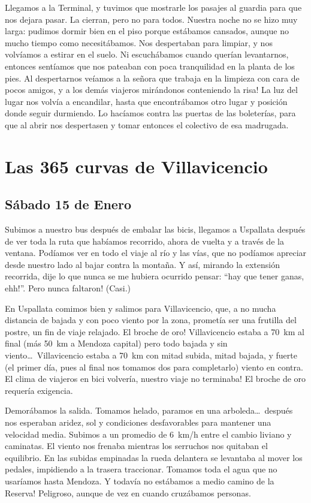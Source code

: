 Llegamos a la Terminal, y tuvimos que mostrarle los pasajes al guardia para que
nos dejara pasar. La cierran, pero no para todos. Nuestra noche no se hizo muy
larga: pudimos dormir bien en el piso porque est\'abamos cansados, aunque no
mucho tiempo como necesit\'abamos. Nos despertaban para limpiar, y nos
volv\'iamos a estirar en el suelo. Ni escuch\'abamos cuando quer\'ian
levantarnos, entonces sent\'iamos que nos pateaban con poca tranquilidad en la
planta de los pies. \textexclamdown Al despertarnos ve\'iamos a la se\~nora que
trabaja en la limpieza con cara de pocos amigos, y a los dem\'as viajeros
mir\'andonos conteniendo la risa! La luz del lugar nos volv\'ia a encandilar,
hasta que encontr\'abamos otro lugar y posici\'on donde seguir durmiendo. Lo
hac\'iamos contra las puertas de las boleter\'ias, para que al abrir nos
despertasen y tomar entonces el colectivo de esa madrugada.

\section{Las 365 curvas de Villavicencio}

\subsection*{S\'abado 15 de Enero}

Subimos a nuestro bus despu\'es de embalar las bicis, llegamos a Uspallata
despu\'es de ver toda la ruta que hab\'iamos recorrido, ahora de vuelta y a
trav\'es de la ventana. Pod\'iamos ver en todo el viaje al r\'io y las v\'ias,
que no pod\'iamos apreciar desde nuestro lado al bajar contra la monta\~na. Y
as\'i, mirando la extensi\'on recorrida, dije lo que nunca se me hubiera
ocurrido pensar: ``\textexclamdown hay que tener ganas, ehh!''. \textexclamdown
Pero nunca faltaron! (Casi.)

En Uspallata comimos bien y salimos para Villavicencio, que, a no mucha
distancia de bajada y con poco viento por la zona, promet\'ia ser una frutilla
del postre, un fin de viaje relajado. \textexclamdown El broche de oro!
Villavicencio estaba a 70~km al final (m\'as 50~km a Mendoza capital) pero todo
bajada y sin viento\ldots\ Villavicencio estaba a 70~km con mitad subida, mitad
bajada, y fuerte (el primer d\'ia, pues al final nos tomamos dos para
completarlo) viento en contra. \textexclamdown El clima de viajeros en bici
volver\'ia, nuestro viaje no terminaba! El broche de oro requer\'ia exigencia.

Demor\'abamos la salida. Tomamos helado, paramos en una arboleda\ldots\
despu\'es nos esperaban aridez, sol y condiciones desfavorables para mantener
una velocidad media. Subimos a un promedio de 6~km/h entre el cambio liviano y
caminatas. El viento nos frenaba mientras los serruchos nos quitaban el
equilibrio. En las subidas empinadas la rueda delantera se levantaba al mover
los pedales, impidiendo a la trasera traccionar. Tomamos toda el agua que no
usar\'iamos hasta Mendoza. \textexclamdown Y todav\'ia no est\'abamos a medio
camino de la Reserva! Peligroso, aunque de vez en cuando cruz\'abamos personas.

